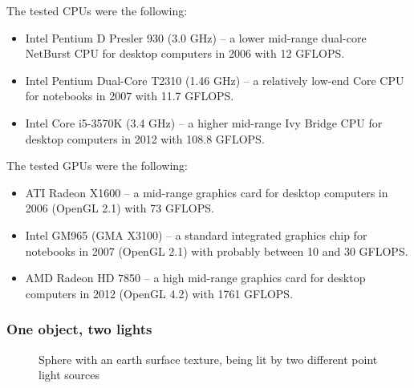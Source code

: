 \documentclass[english,fleqn,10pt,twocolumn]{article}
\begin{document}
The tested CPUs were the following:
\begin{itemize}
    \item Intel Pentium D Presler 930 (3.0 GHz) -- a lower mid-range dual-core NetBurst CPU for desktop computers in 2006 with 12 GFLOPS.
    \item Intel Pentium Dual-Core T2310 (1.46 GHz) -- a relatively low-end Core CPU for notebooks in 2007 with 11.7 GFLOPS.
    \item Intel Core i5-3570K (3.4 GHz) -- a higher mid-range Ivy Bridge CPU for desktop computers in 2012 with 108.8 GFLOPS.
\end{itemize}

The tested GPUs were the following:
\begin{itemize}
    \item ATI Radeon X1600 -- a mid-range graphics card for desktop computers in 2006 (OpenGL 2.1) with 73 GFLOPS.
    \item Intel GM965 (GMA X3100) -- a standard integrated graphics chip for notebooks in 2007 (OpenGL 2.1) with probably between 10 and 30 GFLOPS.
    \item AMD Radeon HD 7850 -- a high mid-range graphics card for desktop computers in 2012 (OpenGL 4.2) with 1761 GFLOPS.
\end{itemize}

\subsubsection{One object, two lights}

\begin{figure}[ht]
    \centering {}
    \caption{Sphere with an earth surface texture, being lit by two different point light sources}
    \label{fig1}
\end{figure}
\end{document}

